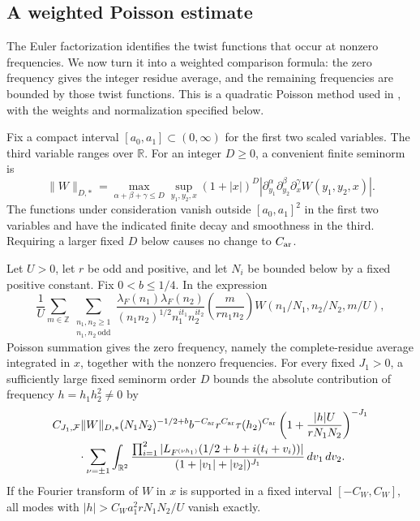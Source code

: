 \subsection{A weighted Poisson estimate}

The Euler factorization identifies the twist functions that occur at
nonzero frequencies. We now turn it into a weighted comparison formula:
the zero frequency gives the integer residue average, and the remaining
frequencies are bounded by those twist functions. This is a quadratic
Poisson method used in \cite[Section~2.4, Lemma~2.6]{Soundararajan2000},
with the weights and normalization specified below.

Fix a compact interval $[a_0,a_1]\subset(0,\infty)$ for the first two
scaled variables. The third variable ranges over $\mathbb R$. For an
integer $D\geq0$, a convenient finite seminorm is
\[
 \|W\|_{D,*}=\max_{\alpha+\beta+\gamma\leq D}
 \sup_{y_1,y_2,x}(1+|x|)^D
 \left|\partial_{y_1}^{\alpha}\partial_{y_2}^{\beta}
                    \partial_x^\gamma W(y_1,y_2,x)\right|.
\]
The functions under consideration vanish outside $[a_0,a_1]^2$ in the
first two variables and have the indicated finite decay and smoothness
in the third. Requiring a larger fixed $D$ below causes no change to
$C_{\rm ar}$.

\begin{lemma}\label{analytic:poisson}
Let $U>0$, let $r$ be odd and positive, and let $N_i$ be bounded below
by a fixed positive constant. Fix $0<b\leq1/4$. In the expression
\begin{equation}\label{analytic:poisson-average}
 \frac1U\sum_{m\in\mathbb Z}
 \sum_{\substack{n_1,n_2\geq1\\n_1,n_2\ \mathrm{odd}}}
 \frac{\lambda_F(n_1)\lambda_F(n_2)}
 {(n_1n_2)^{1/2}n_1^{it_1}n_2^{it_2}}
 \left(\frac m{rn_1n_2}\right)
 W(n_1/N_1,n_2/N_2,m/U),
\end{equation}
Poisson summation gives the zero frequency, namely the complete-residue
average integrated in $x$, together with the nonzero frequencies.
For every fixed $J_1>0$, a sufficiently large fixed seminorm order $D$
bounds the absolute contribution of frequency $h=h_1h_2^2\ne0$ by
\begin{align}
 &C_{J_1,\mathcal F}\|W\|_{D,*}
 (N_1N_2)^{-1/2+b}b^{-C_{\rm ar}}r^{C_{\rm ar}}
 \tau(h_2)^{C_{\rm ar}}
 \left(1+\frac{|h|U}{rN_1N_2}\right)^{-J_1}
 \nonumber\\[-2pt]
 &\hspace{8mm}\cdot
 \sum_{\nu=\pm1}\int_{\mathbb R^2}
 \frac{\prod_{i=1}^2
 |L_{F^{(\nu h_1)}}(1/2+b+i(t_i+v_i))|}
 {(1+|v_1|+|v_2|)^{J_1}}\,dv_1\,dv_2.
 \label{analytic:nonzero-mode}
\end{align}
If the Fourier transform of $W$ in $x$ is supported in a fixed interval
$[-C_W,C_W]$, all modes with
$|h|>C_Wa_1^2rN_1N_2/U$ vanish exactly.
\end{lemma}

